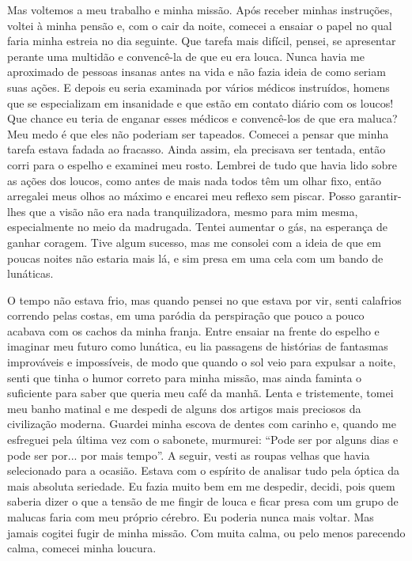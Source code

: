 Mas voltemos a meu trabalho e minha missão. Após receber minhas
instruções, voltei à minha pensão e, com o cair da noite, comecei a
ensaiar o papel no qual faria minha estreia no dia seguinte. Que tarefa
mais difícil, pensei, se apresentar perante uma multidão e convencê-la
de que eu era louca. Nunca havia me aproximado de pessoas insanas antes
na vida e não fazia ideia de como seriam suas ações. E depois eu seria
examinada por vários médicos instruídos, homens que se especializam em
insanidade e que estão em contato diário com os loucos! Que chance eu
teria de enganar esses médicos e convencê-los de que era maluca? Meu
medo é que eles não poderiam ser tapeados. Comecei a pensar que minha
tarefa estava fadada ao fracasso. Ainda assim, ela precisava ser
tentada, então corri para o espelho e examinei meu rosto. Lembrei de
tudo que havia lido sobre as ações dos loucos, como antes de mais nada
todos têm um olhar fixo, então arregalei meus olhos ao máximo e encarei
meu reflexo sem piscar. Posso garantir-lhes que a visão não era nada
tranquilizadora, mesmo para mim mesma, especialmente no meio da
madrugada. Tentei aumentar o gás, na esperança de ganhar coragem. Tive
algum sucesso, mas me consolei com a ideia de que em poucas noites não
estaria mais lá, e sim presa em uma cela com um bando de lunáticas.

O tempo não estava frio, mas quando pensei no que estava por vir, senti
calafrios correndo pelas costas, em uma paródia da perspiração que 
pouco a pouco acabava com os cachos da minha franja. Entre ensaiar na
frente do espelho e imaginar meu futuro como lunática, eu lia passagens
de histórias de fantasmas improváveis e impossíveis, de modo que quando
o sol veio para expulsar a noite, senti que tinha o humor correto para
minha missão, mas ainda faminta o suficiente para saber que queria meu
café da manhã. Lenta e tristemente, tomei meu banho matinal e me despedi
de alguns dos artigos mais preciosos da civilização moderna. Guardei
minha escova de dentes com carinho e, quando me esfreguei pela última
vez com o sabonete, murmurei: ``Pode ser por alguns dias e pode ser
por... por mais tempo''. A seguir, vesti as roupas velhas que havia
selecionado para a ocasião. Estava com o espírito de analisar tudo pela
óptica da mais absoluta seriedade. Eu fazia muito bem em me despedir,
decidi, pois quem saberia dizer o que a tensão de me fingir de louca e
ficar presa com um grupo de malucas faria com meu próprio cérebro. Eu
poderia nunca mais voltar. Mas jamais cogitei fugir de minha missão. Com
muita calma, ou pelo menos parecendo calma, comecei minha loucura.

